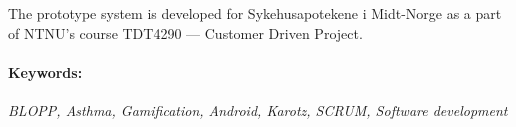 The prototype system is developed for Sykehusapotekene i Midt-Norge as a part of NTNU's course TDT4290 --- Customer Driven Project.

\paragraph{Keywords:}
\emph{BLOPP, Asthma, Gamification, Android, Karotz, SCRUM, Software development}

\vfill
\noindent {} \hfill {}
 \hfill {}
\begin{center}\end{center}
\vspace*{4cm}